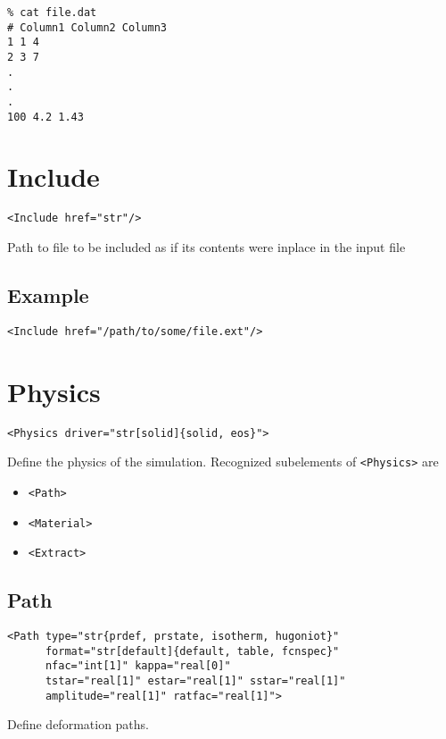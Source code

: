 \documentclass[11pt]{report}
\newcommand{\tag}[1]{\texttt{<#1>}}
\begin{document}
\begin{verbatim}
% cat file.dat
# Column1 Column2 Column3
1 1 4
2 3 7
.
.
.
100 4.2 1.43
\end{verbatim}

\section{Include}
\begin{verbatim}
<Include href="str"/>
\end{verbatim}
%
Path to file to be included as if its contents were inplace in the input file

\subsection{Example}
\begin{verbatim}
<Include href="/path/to/some/file.ext"/>
\end{verbatim}

\section{Physics}
\begin{verbatim}
<Physics driver="str[solid]{solid, eos}">
\end{verbatim}
%
Define the physics of the simulation. Recognized subelements of \tag{Physics}
are
%
\begin{itemize}
  \item \tag{Path}
  \item \tag{Material}
  \item \tag{Extract}
\end{itemize}

\subsection{Path}
\begin{verbatim}
<Path type="str{prdef, prstate, isotherm, hugoniot}"
      format="str[default]{default, table, fcnspec}"
      nfac="int[1]" kappa="real[0]"
      tstar="real[1]" estar="real[1]" sstar="real[1]"
      amplitude="real[1]" ratfac="real[1]">
\end{verbatim}
%
Define deformation paths.
\end{document}
